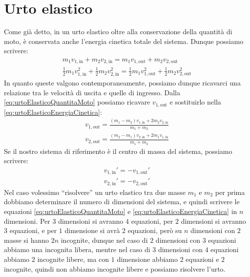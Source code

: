 \section{Urto elastico}
    Come già detto, in un urto elastico oltre alla conservazione della quantità di moto, è conservata anche l'energia cinetica totale del sistema. Dunque possiamo scrivere:
    \begin{align}
        m_1v_{1,\text{in}} + m_2v_{2,\text{in}} = m_1v_{1,\text{out}} + m_2v_{2,\text{out}} \label{eq:urtoElasticoQuantitaMoto}\\
        \frac12m_1v_{1,\text{in}}^2 + \frac12m_2v_{2,\text{in}}^2 = \frac12m_1v_{1,\text{out}}^2 + \frac12m_2v_{2,\text{out}}^2 \label{eq:urtoElasticoEnergiaCinetica}
    \end{align}
    In quanto queste valgono contemporaneamente, possiamo dunque ricavarci una relazione tra le velocità di uscita e quelle di ingresso. Dalla \eqref{eq:urtoElasticoQuantitaMoto} possiamo ricavare $v_{1,\text{out}}$ e sostituirlo nella \eqref{eq:urtoElasticoEnergiaCinetica}:
    \begin{align*}
        v_{1,\text{out}} = \frac{\left(m_1-m_2\right)v_{1,\text{in}} + 2m_2v_{2,\text{in}}}{m_1+m_2}\\
        v_{2,\text{out}} = \frac{\left(m_2-m_1\right)v_{2,\text{in}} + 2m_1v_{1,\text{in}}}{m_1+m_2}
    \end{align*}
    Se il nostro sistema di riferimento è il centro di massa del sistema, possiamo scrivere:
    \begin{align*}
        v_{1,\text{in}}' = -v_{1,\text{out}}'\\
        v_{2,\text{in}}' = -v_{2,\text{out}}'
    \end{align*}
    Nel caso volessimo ``risolvere'' un urto elastico tra due masse $m_1$ e $m_2$ per prima dobbiamo determinare il numero di dimensioni del sistema, e quindi scrivere le equazioni \eqref{eq:urtoElasticoQuantitaMoto} e \eqref{eq:urtoElasticoEnergiaCinetica} in $n$ dimensioni. Per $3$ dimensioni si avranno $4$ equazioni, per $2$ dimensioni si avranno $3$ equazioni, e per $1$ dimensione si avrà $2$ equazioni, però su $n$ dimensioni con $2$ masse si hanno $2n$ incognite, dunque nel caso di $2$ dimensioni con $3$ equazioni abbiamo una incognita libera, mentre nel caso di $3$ dimensioni con $4$ equazioni abbiamo $2$ incognite libere, ma con $1$ dimensione abbiamo $2$ equazioni e $2$ incognite, quindi non abbiamo incognite libere e possiamo risolvere l'urto. 

